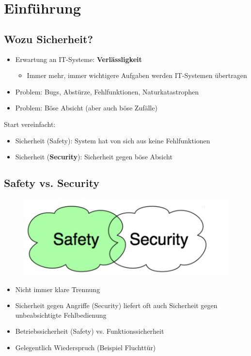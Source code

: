 \documentclass[openany]{book}
\begin{document}

\tableofcontents

\chapter{Einführung}

\section{Wozu Sicherheit?}

\begin{itemize}
\item Erwartung an IT-Systeme: \textbf{Verlässligkeit}
\begin{itemize}
\item Immer mehr, immer wichtigere Aufgaben werden IT-Systemen übertragen
\end{itemize}
\item Problem: Bugs, Abstürze, Fehlfunktionen, Naturkatastrophen
\item Problem: Böse Absicht (aber auch böse Zufälle) 
\end{itemize}

Start vereinfacht:
\begin{itemize}
\item Sicherheit (Safety): System hat von sich aus keine Fehlfunktionen
\item Sicherheit (\textbf{Security}): Sicherheit gegen böse Absicht
\end{itemize}

\section{Safety vs. Security}

\begin{figure}[h!]
\centering
\includegraphics[width=0.7\linewidth]{Pics/SafetyVsSecurity.PNG}
\end{figure}

\begin{itemize}
\item Nicht immer klare Trennung
\item Sicherheit gegen Angriffe (Security) liefert oft auch Sicherheit gegen unbeabsichtigte Fehlbedienung
\item Betriebssicherheit (Safety) vs. Funktionssicherheit
\item Gelegentlich Wiederspruch (Beispiel Fluchttür)
\end{itemize}
\end{document}
